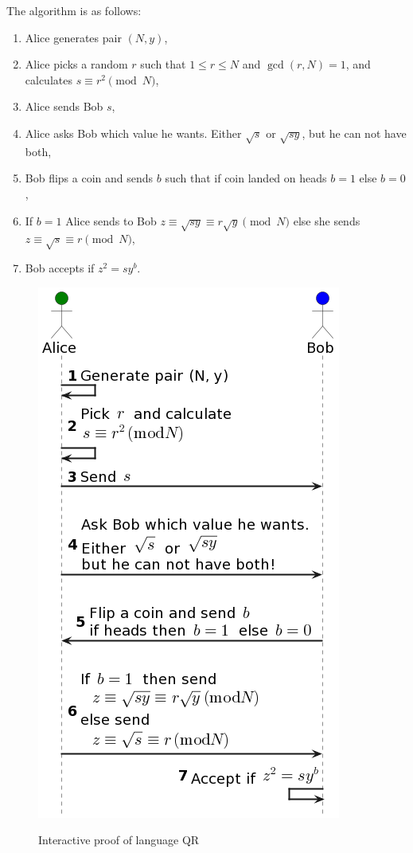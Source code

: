 \documentclass[conference,comsoc,10pt]{IEEEtran}
\begin{document}
        The algorithm is as follows\cite{Goldwasser1989}:
        \begin{enumerate}
            \item Alice generates pair $(N, y)$,
            \item Alice picks a random $r$ such that $1 \leq r \leq N$ and $\gcd(r, N) = 1$,
                  and calculates $s \equiv r^2 \pmod{N}$,
            \item Alice sends Bob $s$,
            \item Alice asks Bob which value he wants. Either $\sqrt{s}$ or $\sqrt{sy}$, but he can not have both,
            \item Bob flips a coin and sends $b$ such that if coin landed on heads $b = 1$ else $b = 0$,
            \item If $b = 1$ Alice sends to Bob $z \equiv \sqrt{sy} \equiv r \sqrt{y} \pmod{N}$ else she sends $z \equiv \sqrt{s} \equiv r \pmod{N}$,
            \item Bob accepts if $z^2 = sy^b$.
        \end{enumerate}

        \begin{figure}[h!]
            \centering
            \includegraphics[scale=0.5]{../bachelor/assets/images/qr_ip.png}
            \caption{Interactive proof of language QR}
            \cite{Goldwasser1989, youtubeMOOCLecture1}
            \label{fig:qr_ip}
            \vspace{0.5cm}
        \end{figure}
\end{document}
